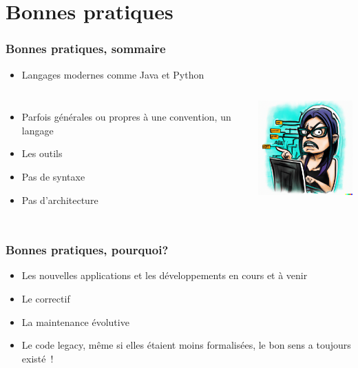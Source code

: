 \documentclass{beamer}
\begin{document}
    \section{Bonnes pratiques}\label{sec:bonnes-pratiques}

    \begin{frame}
        \transdissolve
        \frametitle{Bonnes pratiques, sommaire}
        \begin{itemize}
            \item Langages modernes comme Java et Python
        \end{itemize}
        \begin{columns}
            \begin{itemize}
                \item Parfois générales ou propres à une convention, un langage
                \item Les outils
                \item Pas de syntaxe 
                \item Pas d'architecture 
            \end{itemize}
            \centering
            \includegraphics[width=4cm]{image/maniac-programmer-sorting-her-code.png}
        \end{columns}
    \end{frame}

    \begin{frame}
        \transdissolve
        \frametitle{Bonnes pratiques, pourquoi?}
        \begin{itemize}
            \item Les nouvelles applications et les développements en cours et à venir
            \item Le correctif
            \item La maintenance évolutive
            \item Le code legacy, même si elles étaient moins formalisées, le bon sens a toujours existé~!
        \end{itemize}
    \end{frame}
\end{document}
